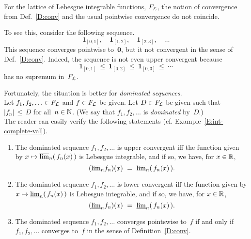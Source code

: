 \documentclass[main.tex]{subfiles}
\begin{document}
\begin{ex}
\label{E:conv_leb}
For the lattice of Lebesgue integrable functions, $F_{\mathcal{L}}$,
the notion of convergence from Def.~\ref{D:conv}
and the usual pointwise convergence 
do not coincide.

To see this,
consider the following sequence.
\begin{equation*}
\mathbf{1}_{[0,1]},\quad \mathbf{1}_{[1,2]},\quad \mathbf{1}_{[2,3]},\quad 
\dotsc
\end{equation*}
This sequence converges pointwise to~$\mathbf{0}$,
but it not convergent in the sense of Def.~\ref{D:conv}.
Indeed, the sequence is not even upper convergent
because 
\begin{equation*}
\mathbf{1}_{[0,1]} 
\ \leq\ \mathbf{1}_{[0,2]} 
\ \leq\ \mathbf{1}_{[0,3]}  \ \leq\ \dotsb
\end{equation*}
has no supremum in~$F_{\mathcal{L}}$.

Fortunately,
the situation is better for \emph{dominated sequences}.\\
Let $f_1,f_2,\dotsc \in F_{\mathcal{L}}$ and $f\in F_{\mathcal{L}}$ be given.
Let $D\in F_{\mathcal{L}}$ be given
such 
that $|f_n|\,\leq\,D$ for all~$n\in\mathbb{N}$.
(We say that $f_1,f_2,\dotsc$ is \emph{dominated} by~$D$.)\\
The reader can easily verify
the following statements
(cf. Example~\ref{E:int-complete-val}).
\begin{enumerate}
\item
\label{E:conv_leb_1}
The dominated sequence $f_1,f_2,\dotsc$
is upper convergent
iff
the function given by 
$x\mapsto \smash{\overline{\lim}_{n}}(\,{f_n}(x)\,)$
is Lebesgue integrable,
and if so, we have, for $x\in\mathbb{R}$,
\begin{equation*}
(\ulim{n} f_n)(x) \ =\  \ulim{n}(\,{f_n}(x)\,).
\end{equation*}

\item
\label{E:conv_leb_2}
The dominated sequence $f_1,f_2,\dotsc$
is lower convergent
iff
the function given by 
$x\mapsto \smash{\underline{\lim}_{n}}(\,{f_n}(x)\,)$
is Lebesgue integrable,
and if so, we have, for $x\in\mathbb{R}$,
\begin{equation*}
(\llim{n} f_n)(x) \ =\  \llim{n}(\,{f_n}(x)\,).
\end{equation*}

\item
\label{E:conv_leb_3}
The dominated sequence $f_1,f_2,\dotsc$
converges pointswise to~$f$
if and only if
$f_1,f_2,\dotsc$
converges to~$f$ 
in the sense of Definition~\ref{D:conv}.
\end{enumerate}
\end{ex}
\end{document}
